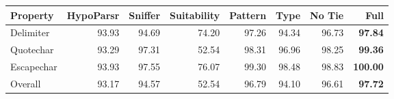 \begin{tabular}{lrrr|rrrr}
Property & HypoParsr & Sniffer & Suitability & Pattern & Type & No Tie & Full\\
\hline
Delimiter & 93.93 & 94.69 & 74.20 & 97.26 & 94.34 & 96.73 & \textbf{97.84}\\
Quotechar & 93.29 & 97.31 & 52.54 & 98.31 & 96.96 & 98.25 & \textbf{99.36}\\
Escapechar & 93.93 & 97.55 & 76.07 & 99.30 & 98.48 & 98.83 & \textbf{100.00}\\
Overall & 93.17 & 94.57 & 52.54 & 96.79 & 94.10 & 96.61 & \textbf{97.72}\\
\hline
\end{tabular}